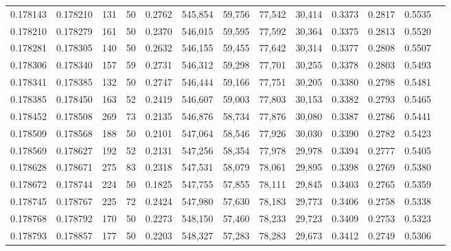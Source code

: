 \begin{tabular}{rrrrrrrrrrrrr}
0.178143 & 0.178210 &   131 &  50 &                                     0.2762 & 545,854 &  59,756 &  77,542 &  30,414 & 0.3373 & 0.2817 & 0.5535 \\
0.178210 & 0.178279 &   161 &  50 &                                     0.2370 & 546,015 &  59,595 &  77,592 &  30,364 & 0.3375 & 0.2813 & 0.5520 \\
0.178281 & 0.178305 &   140 &  50 &                                     0.2632 & 546,155 &  59,455 &  77,642 &  30,314 & 0.3377 & 0.2808 & 0.5507 \\
0.178306 & 0.178340 &   157 &  59 &                                     0.2731 & 546,312 &  59,298 &  77,701 &  30,255 & 0.3378 & 0.2803 & 0.5493 \\
0.178341 & 0.178385 &   132 &  50 &                                     0.2747 & 546,444 &  59,166 &  77,751 &  30,205 & 0.3380 & 0.2798 & 0.5481 \\
0.178385 & 0.178450 &   163 &  52 &                                     0.2419 & 546,607 &  59,003 &  77,803 &  30,153 & 0.3382 & 0.2793 & 0.5465 \\
0.178452 & 0.178508 &   269 &  73 &                                     0.2135 & 546,876 &  58,734 &  77,876 &  30,080 & 0.3387 & 0.2786 & 0.5441 \\
0.178509 & 0.178568 &   188 &  50 &                                     0.2101 & 547,064 &  58,546 &  77,926 &  30,030 & 0.3390 & 0.2782 & 0.5423 \\
0.178569 & 0.178627 &   192 &  52 &                                     0.2131 & 547,256 &  58,354 &  77,978 &  29,978 & 0.3394 & 0.2777 & 0.5405 \\
0.178628 & 0.178671 &   275 &  83 &                                     0.2318 & 547,531 &  58,079 &  78,061 &  29,895 & 0.3398 & 0.2769 & 0.5380 \\
0.178672 & 0.178744 &   224 &  50 &                                     0.1825 & 547,755 &  57,855 &  78,111 &  29,845 & 0.3403 & 0.2765 & 0.5359 \\
0.178745 & 0.178767 &   225 &  72 &                                     0.2424 & 547,980 &  57,630 &  78,183 &  29,773 & 0.3406 & 0.2758 & 0.5338 \\
0.178768 & 0.178792 &   170 &  50 &                                     0.2273 & 548,150 &  57,460 &  78,233 &  29,723 & 0.3409 & 0.2753 & 0.5323 \\
0.178793 & 0.178857 &   177 &  50 &                                     0.2203 & 548,327 &  57,283 &  78,283 &  29,673 & 0.3412 & 0.2749 & 0.5306 \\

\end{tabular}
